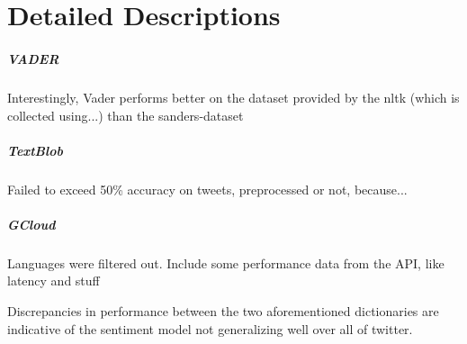 \chapter{Detailed Descriptions}
\label{chapter:DetailedDescriptions}\label{sentimentanalysis}


\paragraph{VADER}
Interestingly, Vader performs better on the dataset provided by the nltk (which is collected using...) than the sanders-dataset

\paragraph{TextBlob}
Failed to exceed 50\% accuracy on tweets, preprocessed or not, because...

\paragraph{GCloud}
Languages were filtered out.
Include some performance data from the API, like latency and stuff


Discrepancies in performance between the two aforementioned dictionaries are indicative of the sentiment model not generalizing well over all of twitter.

\newpage
